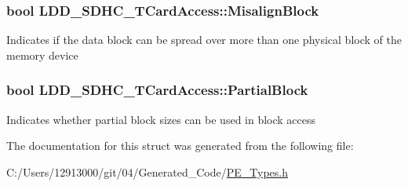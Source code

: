 \subsubsection[{Misalign\+Block}]{\setlength{\rightskip}{0pt plus 5cm}bool L\+D\+D\+\_\+\+S\+D\+H\+C\+\_\+\+T\+Card\+Access\+::\+Misalign\+Block}\label{struct_l_d_d___s_d_h_c___t_card_access_aa56e65353fd03ffdbd8cc8d19537b621}
Indicates if the data block can be spread over more than one physical block of the memory device \hypertarget{struct_l_d_d___s_d_h_c___t_card_access_a9d78668915e934548a04351b20ec2d0a}{}
\subsubsection[{Partial\+Block}]{\setlength{\rightskip}{0pt plus 5cm}bool L\+D\+D\+\_\+\+S\+D\+H\+C\+\_\+\+T\+Card\+Access\+::\+Partial\+Block}\label{struct_l_d_d___s_d_h_c___t_card_access_a9d78668915e934548a04351b20ec2d0a}
Indicates whether partial block sizes can be used in block access 

The documentation for this struct was generated from the following file\+:\begin{DoxyCompactItemize}
\item 
C\+:/\+Users/12913000/git/04/\+Generated\+\_\+\+Code/\hyperlink{_p_e___types_8h}{P\+E\+\_\+\+Types.\+h}\end{DoxyCompactItemize}
